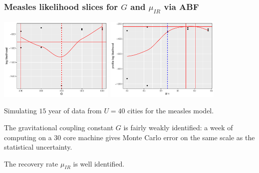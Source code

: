 \documentclass{beamer}
\begin{document}
\begin{frame}

\frametitle{Measles likelihood slices for $G$ and $\mu_{IR}$ via ABF}

\vspace{-3mm}

\includegraphics[width=5.5cm]{slice_plot-1.pdf}
\includegraphics[width=5.5cm]{gammaSlice_plot-1.pdf}

\begin{myitemize}
\item 
Simulating $15$ year of data from $U=40$ cities for the measles model.
\item
The gravitational coupling constant $G$ is fairly weakly identified: a week of computing on a 30 core machine gives Monte Carlo error on the same scale as the statistical uncertainty.
\item
The recovery rate $\mu_{IR}$ is well identified.
\end{myitemize}
\vspace{-2mm}

\end{frame}
\end{document}

